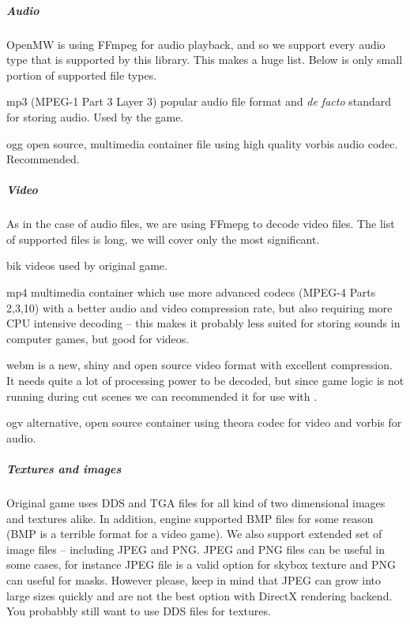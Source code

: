 \subparagraph{Audio}
OpenMW is using {FFmpeg} for audio playback, and so we support every audio type that is supported by this library. This makes a huge list.
Below is only small portion of supported file types.

\begin{description}
 \item mp3 ({MPEG}-1 {Part 3 Layer 3}) popular audio file format and \textit{de facto} standard for storing audio. Used by the \MW{} game.
 \item ogg open source, multimedia container file using high quality vorbis audio codec. Recommended.
\end{description}

\subparagraph{Video}
As in the case of audio files, we are using {FFmepg} to decode video files. The list of supported files is long, we will cover
only the most significant.

\begin{description}
 \item bik videos used by original \MW{} game.
 \item mp4 multimedia container which use more advanced codecs ({MPEG-4 Parts 2,3,10}) with a better audio and video compression rate,
 but also requiring more {CPU} intensive decoding -- this makes it probably less suited for storing sounds in computer games, but good for videos.
 \item webm is a new, shiny and open source video format with excellent compression. It needs quite a lot of processing power to be decoded,
 but since game logic is not running during cut scenes we can recommended it for use with \OMW.
 \item ogv alternative, open source container using theora codec for video and vorbis for audio.
\end{description}

\subparagraph{Textures and images}
Original \MW{} game uses {DDS} and {TGA} files for all kind of two dimensional images and textures alike. In addition, engine supported BMP
files for some reason ({BMP} is a terrible format for a video game). We also support extended set of image files -- including {JPEG} and {PNG}.
JPEG and PNG files can be useful in some cases, for instance JPEG file is a valid option for skybox texture and PNG can useful for masks.
However please, keep in mind that JPEG can grow into large sizes quickly and are not the best option with {DirectX} rendering backend. You probabbly still want 
to use {DDS} files for textures.

